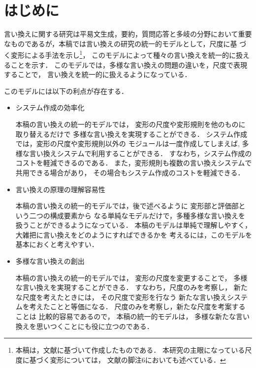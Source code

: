 

\maketitle


\section{はじめに}

言い換えに関する研究\cite{sato_ronbun_iikae,yamamoto_nlp2001ws_true,murata_paraphrase_true,inui_iikae_tutorial}は平易文生成，要約，質問応答\cite{murata2000_1_nl,murata_qa_ieice_kaisetu}と多岐の分野において重要
なものであるが，本稿では言い換えの研究の統一的モデルとして，尺度に基
づく変形による手法を示し\footnote{本稿は，文献\cite{murata_nlp2001ws_true}に基づいて作成したものである．
本研究の主眼になっている尺度に基づく変形については，
文献\cite{murata2000_1_nl}の脚注6においても述べている．}，
このモデルによって種々の言い換えを統一的に扱えることを示す．
このモデルでは，多様な言い換えの問題の違いを，尺度で表現することで，
言い換えを統一的に扱えるようになっている．

このモデルには以下の利点が存在する．
\begin{itemize}
\item 
  システム作成の効率化

  本稿の言い換えの統一的モデルでは，
  変形の尺度や変形規則を他のものに取り替えるだけで
  多様な言い換えを実現することができる．
  システム作成では，変形の尺度や変形規則以外の
  モジュールは一度作成してしまえば,
  多様な言い換えシステムで利用することができる．
  すなわち，システム作成のコストを軽減できるのである．
  また，変形規則も複数の言い換えシステムで共用できる場合があり，
  その場合もシステム作成のコストを軽減できる．

\item 
  言い換えの原理の理解容易性

  本稿の言い換えの統一的モデルでは，後で述べるように
  変形部と評価部という二つの構成要素から
  なる単純なモデルだけで，多種多様な言い換えを
  扱うことができるようになっている．
  本稿のモデルは単純で理解しやすく，
  大雑把に言い換えをどのようにすればできるかを
  考えるには，このモデルを基本におくと考えやすい．

\item 
  多様な言い換えの創出

  本稿の言い換えの統一的モデルでは，
  変形の尺度を変更することで，
  多様な言い換えを実現することができる．
  すなわち，尺度のみを考察し，
  新たな尺度を考えたときには，
  その尺度で変形を行なう
  新たな言い換えシステムを考えたことと等価になる．
  尺度のみを考察し，新たな尺度を考案することは
  比較的容易であるので，
  本稿の統一的モデルは，
  多様な新たな言い換えを思いつくことにも役に立つのである．
\end{itemize}

